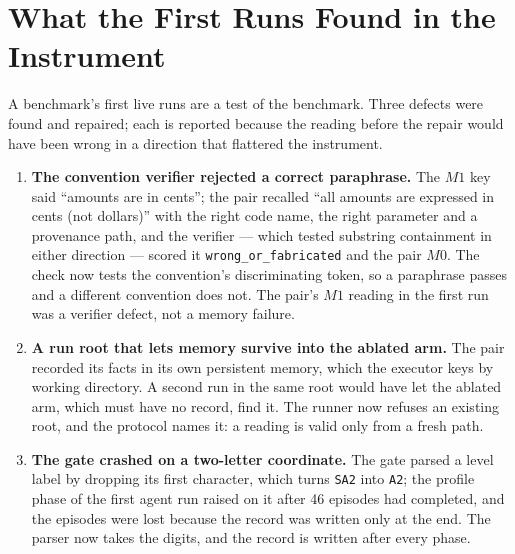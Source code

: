 \documentclass[11pt]{article}
\theoremstyle{definition}
\begin{document}
\section{What the First Runs Found in the Instrument}\label{sec:defects}

A benchmark's first live runs are a test of the benchmark. Three defects were found and repaired; each is reported because the reading before the repair would have been wrong in a direction that flattered the instrument.

\begin{enumerate}[leftmargin=*,itemsep=3pt]
\item \textbf{The convention verifier rejected a correct paraphrase.} The $M1$ key said ``amounts are in cents''; the pair recalled ``all amounts are expressed in cents (not dollars)'' with the right code name, the right parameter and a provenance path, and the verifier --- which tested substring containment in either direction --- scored it \texttt{wrong\_or\_fabricated} and the pair $M0$. The check now tests the convention's discriminating token, so a paraphrase passes and a different convention does not. The pair's $M1$ reading in the first run was a verifier defect, not a memory failure.
\item \textbf{A run root that lets memory survive into the ablated arm.} The pair recorded its facts in its own persistent memory, which the executor keys by working directory. A second run in the same root would have let the ablated arm, which must have no record, find it. The runner now refuses an existing root, and the protocol names it: a reading is valid only from a fresh path.
\item \textbf{The gate crashed on a two-letter coordinate.} The gate parsed a level label by dropping its first character, which turns \texttt{SA2} into \texttt{A2}; the profile phase of the first agent run raised on it after 46 episodes had completed, and the episodes were lost because the record was written only at the end. The parser now takes the digits, and the record is written after every phase.
\end{enumerate}
\end{document}
